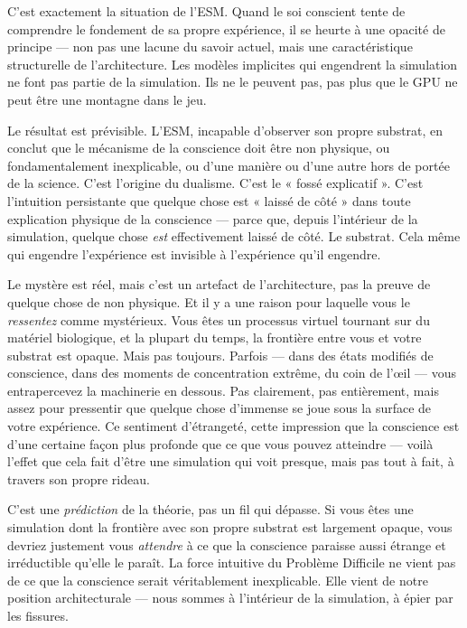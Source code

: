 \documentclass[11pt, twoside, openright]{book}
\begin{document}
C'est exactement la situation de l'ESM. Quand le soi conscient tente de comprendre le fondement de sa propre expérience, il se heurte à une opacité de principe --- non pas une lacune du savoir actuel, mais une caractéristique structurelle de l'architecture. Les modèles implicites qui engendrent la simulation ne font pas partie de la simulation. Ils ne le peuvent pas, pas plus que le GPU ne peut être une montagne dans le jeu.

Le résultat est prévisible. L'ESM, incapable d'observer son propre substrat, en conclut que le mécanisme de la conscience doit être non physique, ou fondamentalement inexplicable, ou d'une manière ou d'une autre hors de portée de la science. C'est l'origine du dualisme. C'est le « fossé explicatif ». C'est l'intuition persistante que quelque chose est « laissé de côté » dans toute explication physique de la conscience --- parce que, depuis l'intérieur de la simulation, quelque chose \textit{est} effectivement laissé de côté. Le substrat. Cela même qui engendre l'expérience est invisible à l'expérience qu'il engendre.

Le mystère est réel, mais c'est un artefact de l'architecture, pas la preuve de quelque chose de non physique. Et il y a une raison pour laquelle vous le \textit{ressentez} comme mystérieux. Vous êtes un processus virtuel tournant sur du matériel biologique, et la plupart du temps, la frontière entre vous et votre substrat est opaque. Mais pas toujours. Parfois --- dans des états modifiés de conscience, dans des moments de concentration extrême, du coin de l'œil --- vous entrapercevez la machinerie en dessous. Pas clairement, pas entièrement, mais assez pour pressentir que quelque chose d'immense se joue sous la surface de votre expérience. Ce sentiment d'étrangeté, cette impression que la conscience est d'une certaine façon plus profonde que ce que vous pouvez atteindre --- voilà l'effet que cela fait d'être une simulation qui voit presque, mais pas tout à fait, à travers son propre rideau.

C'est une \textit{prédiction} de la théorie, pas un fil qui dépasse. Si vous êtes une simulation dont la frontière avec son propre substrat est largement opaque, vous devriez justement vous \textit{attendre} à ce que la conscience paraisse aussi étrange et irréductible qu'elle le paraît. La force intuitive du Problème Difficile ne vient pas de ce que la conscience serait véritablement inexplicable. Elle vient de notre position architecturale --- nous sommes à l'intérieur de la simulation, à épier par les fissures.
\end{document}
